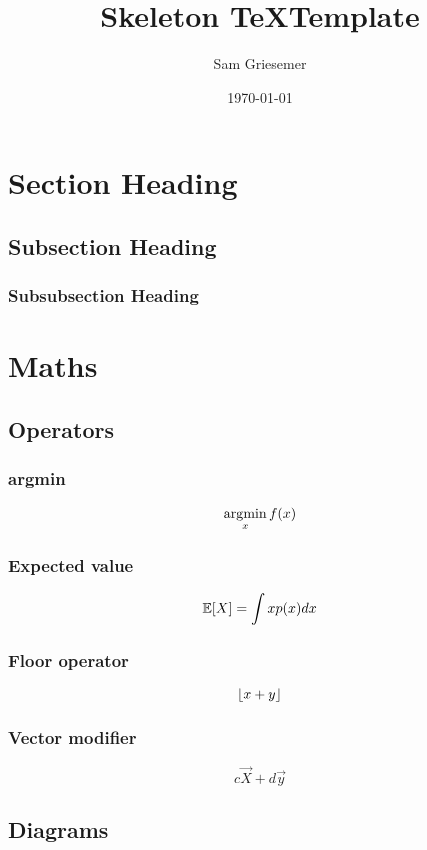 \documentclass{article}
\title{Skeleton \TeX Template}
\author{Sam Griesemer}
\date{\today}
\begin{document}
{
\maketitle
\tableofcontents
}
\newpage

\section{Section Heading}
\subsection{Subsection Heading}
\subsubsection{Subsubsection Heading}

\section{Maths}
\subsection{Operators}
\subsubsection{argmin}
$$\operatorname*{\arg\!\min}_{x}{f(x)}$$

\subsubsection{Expected value}
$$\operatorname{\mathbb{E}}[X] = \int{xp(x)dx}$$

\subsubsection{Floor operator}
$$\lfloor x+y\rfloor$$

\subsubsection{Vector modifier}
$$c\vec{X} + d\vec{y}$$

\subsection{Diagrams}
\end{document}
